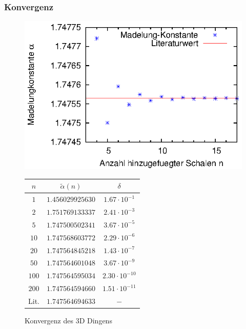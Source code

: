 \documentclass[10pt,a4paper]{article}
\begin{document}
\subsubsection{Konvergenz}

\label{sssec:Konvergenz}
\begin{figure}[h]
\begin{minipage}[c]{0.5\textwidth}
\captionsetup{type=figure}
\begin{center}
\includegraphics[width=\textwidth]{./figures/ergebnis.eps}
\caption{Konvergenz des 3D Dingens}
\label{plotkonvergenz3d}
\end{center}
\end{minipage}
\begin{minipage}[c]{0.5\textwidth}
\captionsetup{type=table}
\begin{center}
\begin{tabular}{c|c|c}
\rule[-1ex]{0pt}{2.5ex} $n$ & $\tilde{\alpha}(n)$ & $\delta$ \\ 
\hline 
\rule[-1ex]{0pt}{2.5ex} $1$ & $1.456029925630$ & $1.67\cdot10^{-1}$ \\ 
\hline 
\rule[-1ex]{0pt}{2.5ex} $2$ & $1.751769133337$ & $2.41\cdot10^{-3}$ \\ 
\hline
\rule[-1ex]{0pt}{2.5ex} $5$ & $1.747500502341$ & $3.67\cdot10^{-5}$ \\ 
\hline 
\rule[-1ex]{0pt}{2.5ex} $10$ & $1.747568603772$ & $2.29\cdot10^{-6}$ \\ 
\hline 
\rule[-1ex]{0pt}{2.5ex} $20$ & $1.747564845218$ & $1.43\cdot10^{-7}$ \\ 
\hline 
\rule[-1ex]{0pt}{2.5ex} $50$ & $1.747564601048$ & $3.67\cdot10^{-9}$ \\
\hline
\rule[-1ex]{0pt}{2.5ex} $100$ & $1.747564595034$ & $2.30\cdot10^{-10}$ \\ 
\hline
\rule[-1ex]{0pt}{2.5ex} $200$ & $1.747564594660$ & $1.51\cdot10^{-11}$ \\ 
\hline
\rule[1ex]{0pt}{2.5ex} Lit. & $1.747564694633$ & $ - $
\end{tabular}
\label{tab:konvergenz3d}
\end{center}
\end{minipage}
\end{figure}
\end{document}
